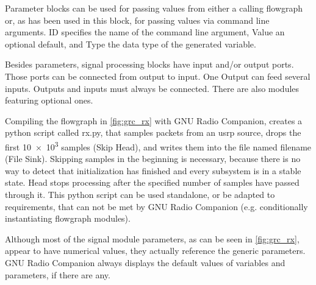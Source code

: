 \documentclass[12pt,a4paper,parskip=full,abstracton]{scrartcl}
\begin{document}
{\ttfamily Parameter} blocks can be used for passing values from either a calling flowgraph or, as has
been used in this block, for passing values via command line arguments. {\ttfamily ID} specifies the
name of the command line argument, {\ttfamily Value} an optional default, and {\ttfamily Type} the data
type of the generated variable.

Besides parameters, signal processing blocks have input and/or output ports. Those ports
can be connected from output to input. One Output can feed several inputs. Outputs and inputs
must always be connected. There are also modules featuring optional ones.

Compiling the flowgraph in \cref{fig:grc_rx} with GNU Radio Companion, creates a python script
called {\ttfamily rx.py}, that samples packets from an \gls{usrp} source, drops the first
\num{10e3} samples ({\ttfamily Skip Head}), and writes
them into the file named {\ttfamily filename} ({\ttfamily File Sink}). Skipping samples in the
beginning is necessary, because there is no way to detect that initialization has finished
and every subsystem is in a stable state. {\ttfamily Head}
stops processing after the specified number of samples have passed through it. This python
script can be used standalone, or be adapted to requirements, that can not be met by GNU Radio
Companion (e.g. conditionally instantiating flowgraph modules).

Although most of the signal module parameters, as can be seen in \cref{fig:grc_rx}, appear to have
numerical values, they actually reference the generic parameters. GNU Radio Companion always displays the
default values of variables and parameters, if there are any.
\end{document}
